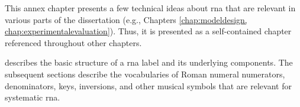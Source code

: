 
This annex chapter presents a few technical ideas about
\gls{rna} that are relevant in various parts of the
dissertation (e.g., Chapters \ref{chap:modeldesign,
chap:experimentalevaluation}). Thus, it is presented as a
self-contained chapter referenced throughout other chapters.

 describes
the basic structure of a \gls{rna} label and its underlying
components. The subsequent sections describe the
vocabularies of Roman numeral numerators, denominators,
keys, inversions, and other musical symbols that are
relevant for systematic \gls{rna}.
